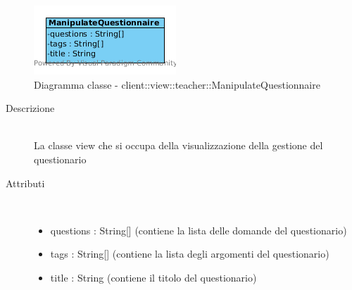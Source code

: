 \vspace{0.5cm}
\hypertarget{client::view::teacher::ManipulateQuestionnaire}{}
\begin{center}
			\begin{figure}[H]
				\centering \includegraphics[scale=4, max width=\textwidth, max height=\myheight]{../img/diagrammiClassi/client/view/teacher/ManipulateQuestionnaire.png}
				\caption{Diagramma classe - client::view::teacher::ManipulateQuestionnaire}
			\end{figure}
		\end{center}\begin{description}
\item[Descrizione] \hfill \\
 La classe view che si occupa della visualizzazione della gestione del questionario 
\item[Attributi] \hfill \\
 \vspace{-7mm}
\begin{itemize}
\item questions : String[] (contiene la lista  delle domande del questionario)
\item tags : String[] (contiene la lista degli argomenti del questionario)
\item title : String (contiene il titolo del questionario)
\end{itemize}

\end{description}


